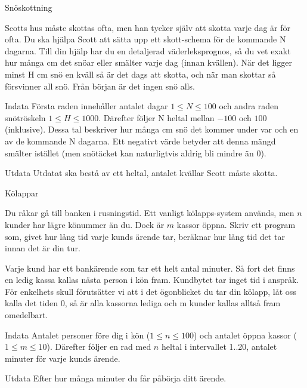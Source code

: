 \documentclass[10pt]{beamer}
\begin{document}
\begin{frame}{Snöskottning}

Scotts hus måste skottas ofta, men han tycker själv att skotta varje dag är för ofta. Du ska hjälpa Scott att sätta upp ett skott-schema för de kommande N dagarna. Till din hjälp har du en detaljerad väderleksprognos, så du vet exakt hur många cm det snöar eller smälter varje dag (innan kvällen). När det ligger minst H cm snö en kväll så är det dags att skotta, och när man skottar så försvinner all snö. Från början är det ingen snö alls.

\begin{exampleblock}{Indata}
Första raden innehåller antalet dagar $1 \le N \le 100$ och andra raden snötröskeln $1 \le H \le 1000$. Därefter följer N heltal mellan $-100$ och $100$ (inklusive). Dessa tal beskriver hur många cm snö det kommer under var och en av de kommande N dagarna. Ett negativt värde betyder att denna mängd smälter istället (men snötäcket kan naturligtvis aldrig bli mindre än 0).
\end{exampleblock}

\begin{exampleblock}{Utdata}
Utdatat ska bestå av ett heltal, antalet kvällar Scott måste skotta.
\end{exampleblock}

\end{frame}





\begin{frame}{Kölappar}

Du råkar gå till banken i rusningstid. Ett vanligt kölapps-system används, men $n$ kunder har lägre könummer än du. Dock är $m$ kassor öppna. Skriv ett program som, givet hur lång tid varje kunds ärende tar, beräknar hur lång tid det tar innan det är din tur.

Varje kund har ett bankärende som tar ett helt antal minuter. Så fort det finns en ledig kassa kallas nästa person i kön fram. Kundbytet tar inget tid i anspråk. För enkelhets skull förutsätter vi att i det ögonblicket du tar din kölapp, låt oss kalla det tiden 0, så är alla kassorna lediga och m kunder kallas alltså fram omedelbart.

\begin{exampleblock}{Indata}
Antalet personer före dig i kön ($1 \le n \le 100$) och antalet öppna kassor ($1 \le m \le 10$). Därefter följer en rad med $n$ heltal i intervallet 1..20, antalet minuter för varje kunds ärende.
\end{exampleblock}

\begin{exampleblock}{Utdata}
Efter hur många minuter du får påbörja ditt ärende.
\end{exampleblock}

\end{frame}
\end{document}
